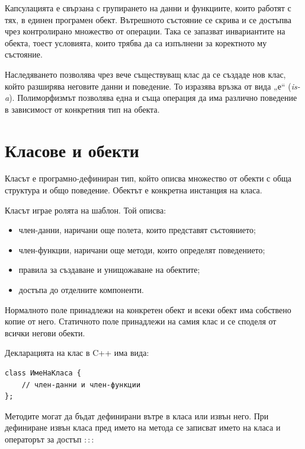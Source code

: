 \begin{defn}[Капсулация]
Капсулацията е свързана с групирането на данни и функциите, които работят с тях, в единен програмен обект. Вътрешното състояние се скрива и се достъпва чрез контролирано множество от операции. Така се запазват инвариантите на обекта, тоест условията, които трябва да са изпълнени за коректното му състояние.
\end{defn}

Наследяването позволява чрез вече съществуващ клас да се създаде нов клас, който разширява неговите данни и поведение. То изразява връзка от вида „е“ (\emph{is-a}). Полиморфизмът позволява една и съща операция да има различно поведение в зависимост от конкретния тип на обекта.

\section{Класове и обекти}\label{s:16.2}

\begin{defn}
Класът е програмно-дефиниран тип, който описва множество от обекти с обща структура и общо поведение. Обектът е конкретна инстанция на класа.
\end{defn}

Класът играе ролята на шаблон. Той описва:

\begin{itemize}
    \item член-данни, наричани още полета, които представят състоянието;
    \item член-функции, наричани още методи, които определят поведението;
    \item правила за създаване и унищожаване на обектите;
    \item достъпа до отделните компоненти.
\end{itemize}

\begin{defn}
Нормалното поле принадлежи на конкретен обект и всеки обект има собствено копие от него. Статичното поле принадлежи на самия клас и се споделя от всички негови обекти.
\end{defn}

Декларацията на клас в C++ има вида:

\begin{verbatim}
class ИмеНаКласа {
    // член-данни и член-функции
};
\end{verbatim}

Методите могат да бъдат дефинирани вътре в класа или извън него. При дефиниране извън класа пред името на метода се записват името на класа и операторът за достъп $::$:

